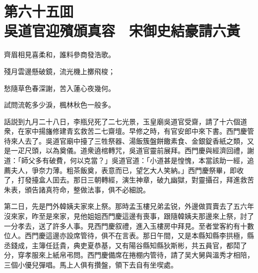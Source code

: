 
\chapter*{第六十五囬　\\吳道官迎殯頒真容　宋御史結豪請六黃}


\begin{myquote}
齊眉相見喜柔和，誰料參商發浩歌。

殘月雲邊懸破鏡，流光機上擲飛梭；

愁隨草色春深謝，苦入蓮心夜幾何。

試問流乾多少淚，楓林秋色一般多。
\end{myquote}

話説到九月二十八日，李瓶兒死了二七光景，玉皇廟吳道官受齋，請了十六個道衆，在家中揚旛修建青玄救苦二七齋壇。早修之時，有官安郎中來下書。西門慶管待來人去了。吳道官廟中擡了三牲祭器、湯飯簇盤餅饊素食、金銀錠香紙之類，又是一疋尺頭，以為奠儀。道衆遶棺轉咒，吳道官靈前展拜。西門慶與經濟回禮，謝道：「師父多有破費，何以克當？」吳道官道：「小道甚是惶愧，本當該助一經，追薦夫人，爭奈力薄。粗茶飯奠，表意而已，望乞大人笑納。」西門慶祭畢，即收了，打發擡盒人囬去。那日三朝轉經，演生神章，破九幽獄，對靈攝召，拜進救苦朱表，頒告諸真符命，整做法事，俱不必細說。

第二日，先是門外韓姨夫家來上祭。那時孟玉樓兄弟孟锐，外邊做買賣去了五六年沒來家，昨至是來家，見他姐姐西門慶這邊有喪事，跟隨韓姨夫那邊來上祭，討了一分孝去，送了許多人事。見西門慶叙禮，進入玉樓房中拜見。至者堂客約有十數位人。西門慶這邊亦設席管待，俱不在言表。那日午間，又是本縣知縣李拱極，縣丞錢成，主簿任廷貴，典吏夏恭基，又有陽谷縣知縣狄斯彬，共五員官，都鬦了分，穿孝服來上紙帛弔問。西門慶備席在捲棚内管待，請了吴大舅與溫秀才相陪，三個小優兒彈唱。馬上人俱有攢盤，領下去自有坐喫處。

